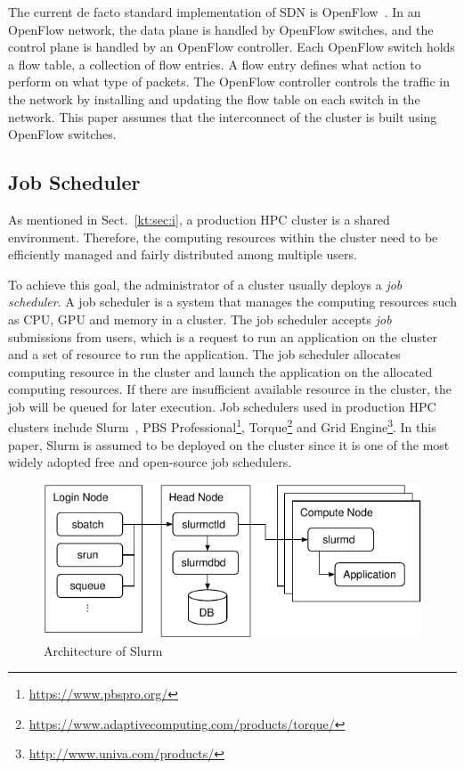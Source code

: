 \documentclass[graybox]{svmult}
\begin{document}
The current de facto standard implementation of SDN is
OpenFlow~\cite{McKeown2008}. In an OpenFlow network, the data plane is handled
by OpenFlow switches, and the control plane is handled by an OpenFlow
controller. Each OpenFlow switch holds a flow table, a collection of flow
entries. A flow entry defines what action to perform on what type of packets.
The OpenFlow controller controls the traffic in the network by installing and
updating the flow table on each switch in the network. This paper assumes that
the interconnect of the cluster is built using OpenFlow switches.

\subsection{Job Scheduler}\label{kt:sec:ii-jms}

As mentioned in Sect.~\ref{kt:sec:i}, a production HPC cluster is a shared
environment. Therefore, the computing resources within the cluster need to be
efficiently managed and fairly distributed among multiple users.

To achieve this goal, the administrator of a cluster usually deploys a
\textit{job scheduler}. A job scheduler is a system that manages the computing
resources such as CPU, GPU and memory in a cluster. The job scheduler accepts
\textit{job} submissions from users, which is a request to run an application
on the cluster and a set of resource to run the application. The job scheduler
allocates computing resource in the cluster and launch the application on the
allocated computing resources. If there are insufficient available resource in
the cluster, the job will be queued for later execution. Job schedulers used
in production HPC clusters include Slurm~\cite{Yoo2003}, PBS
Professional\footnote{\url{https://www.pbspro.org/}},
Torque\footnote{\url{https://www.adaptivecomputing.com/products/torque/}} and
Grid Engine\footnote{\url{http://www.univa.com/products/}}. In this paper,
Slurm is assumed to be deployed on the cluster since it is one of the most
widely adopted free and open-source job schedulers.

\begin{figure}
    \centering
    \includegraphics{slurm}
    \caption{Architecture of Slurm}%
    \label{kt:fig:slurm}
\end{figure}
\end{document}
